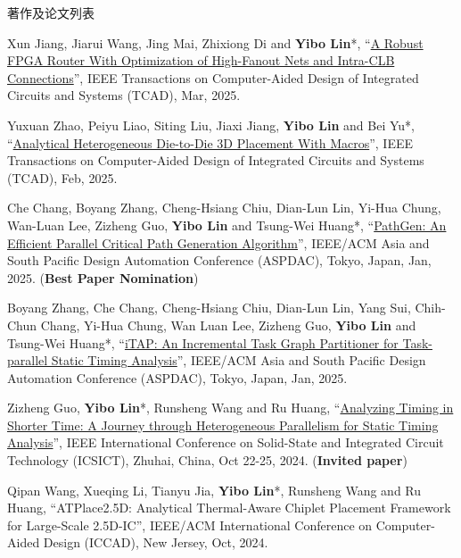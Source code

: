 \begin{rSection}{著作及论文列表}
\begin{description}[font=\normalfont, rightmargin=2em]
\item[{[J169]}]{
        Xun Jiang, Jiarui Wang, Jing Mai, Zhixiong Di and \textbf{Yibo Lin}*, 
    ``\href{https://doi.org/10.1109/TCAD.2024.3447218}{A Robust FPGA Router With Optimization of High-Fanout Nets and Intra-CLB Connections}'', 
    IEEE Transactions on Computer-Aided Design of Integrated Circuits and Systems (TCAD), Mar, 2025.
    
}
            

\item[{[J168]}]{
        Yuxuan Zhao, Peiyu Liao, Siting Liu, Jiaxi Jiang, \textbf{Yibo Lin} and Bei Yu*, 
    ``\href{https://doi.org/10.1109/TCAD.2024.3444716}{Analytical Heterogeneous Die-to-Die 3D Placement With Macros}'', 
    IEEE Transactions on Computer-Aided Design of Integrated Circuits and Systems (TCAD), Feb, 2025.
    
}
            

\item[{[C167]}]{
        Che Chang, Boyang Zhang, Cheng-Hsiang Chiu, Dian-Lun Lin, Yi-Hua Chung, Wan-Luan Lee, Zizheng Guo, \textbf{Yibo Lin} and Tsung-Wei Huang*, 
    ``\href{https://doi.org/10.1145/3658617.3697741}{PathGen: An Efficient Parallel Critical Path Generation Algorithm}'', 
    IEEE/ACM Asia and South Pacific Design Automation Conference (ASPDAC), Tokyo, Japan, Jan, 2025.
    (\textbf{Best Paper Nomination})
}
            

\item[{[C166]}]{
        Boyang Zhang, Che Chang, Cheng-Hsiang Chiu, Dian-Lun Lin, Yang Sui, Chih-Chun Chang, Yi-Hua Chung, Wan Luan Lee, Zizheng Guo, \textbf{Yibo Lin} and Tsung-Wei Huang*, 
    ``\href{https://dl.acm.org/doi/abs/10.1145/3658617.3697738}{iTAP: An Incremental Task Graph Partitioner for Task-parallel Static Timing Analysis}'', 
    IEEE/ACM Asia and South Pacific Design Automation Conference (ASPDAC), Tokyo, Japan, Jan, 2025.
    
}
            

\item[{[C165]}]{
        Zizheng Guo, \textbf{Yibo Lin}*, Runsheng Wang and Ru Huang, 
    ``\href{https://doi.org/10.1109/ICSICT62049.2024.10831648}{Analyzing Timing in Shorter Time: A Journey through Heterogeneous Parallelism for Static Timing Analysis}'', 
    IEEE International Conference on Solid-State and Integrated Circuit Technology (ICSICT), Zhuhai, China, Oct 22-25, 2024.
    (\textbf{Invited paper})
}
            

\item[{[C164]}]{
        Qipan Wang, Xueqing Li, Tianyu Jia, \textbf{Yibo Lin}*, Runsheng Wang and Ru Huang, 
    ``ATPlace2.5D: Analytical Thermal-Aware Chiplet Placement Framework for Large-Scale 2.5D-IC'', 
    IEEE/ACM International Conference on Computer-Aided Design (ICCAD), New Jersey, Oct, 2024.
    
}
\end{description}
\end{rSection}
